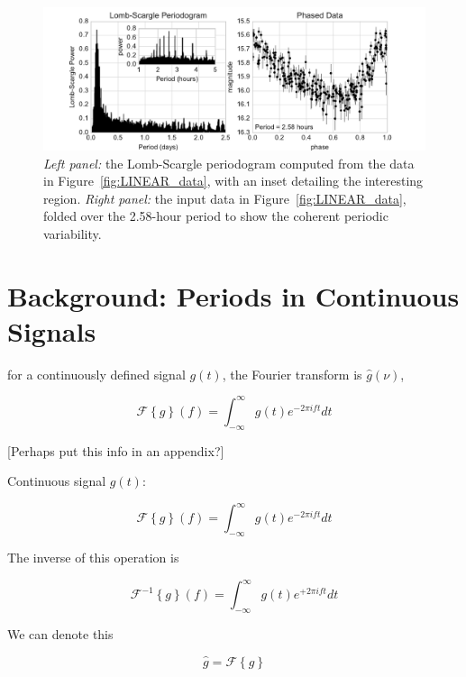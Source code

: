 \documentclass[preprint]{aastex}
\newcommand{\Fig}[1]{Figure~\ref{fig:#1}}
\newcommand{\fig}[1]{\Fig{#1}}
\newcommand{\figlabel}[1]{\label{fig:#1}}
\begin{document}
\begin{figure}[ht]
\centering
\includegraphics[width=\textwidth]{fig02_LINEAR_PSD}
\caption{{\it Left panel:} the Lomb-Scargle periodogram computed from the data
    in \fig{LINEAR_data}, with an inset detailing the interesting region.
    {\it Right panel:} the input data in \fig{LINEAR_data}, folded over the
    2.58-hour period to show the coherent periodic variability.
    \figlabel{LINEAR_power}
}
\end{figure}


\section{Background: Periods in Continuous Signals}

for a continuously defined signal $g(t)$, the Fourier transform is $\hat{g}(\nu)$,

\begin{equation}
    \mathcal{F}\left\{g\right\}(f) = \int_{-\infty}^\infty g(t) e^{-2\pi i f t} dt
\end{equation}

[Perhaps put this info in an appendix?]

Continuous signal $g(t)$:

\begin{equation}
  \mathcal{F}\left\{g\right\}(f) = \int_{-\infty}^\infty g(t) e^{-2\pi i f t} dt
\end{equation}

The inverse of this operation is

\begin{equation}
  \mathcal{F}^{-1}\left\{g\right\}(f) = \int_{-\infty}^\infty g(t) e^{+2\pi i f t} dt
\end{equation}

We can denote this

\begin{equation}
  \hat{g} = \mathcal{F}\left\{g\right\}
\end{equation}
\end{document}
